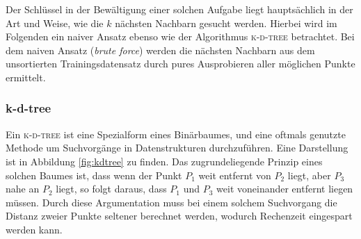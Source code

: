 Der Schlüssel in der Bewältigung einer solchen Aufgabe liegt hauptsächlich in der Art und Weise, wie die $k$ nächsten Nachbarn gesucht werden. Hierbei wird im Folgenden ein naiver Ansatz ebenso wie der Algorithmus \textsc{k-d-tree} betrachtet. Bei dem naiven Ansatz (\textit{brute force}) werden die nächsten Nachbarn aus dem unsortierten Trainingsdatensatz durch pures Ausprobieren aller möglichen Punkte ermittelt.

\subsubsection{k-d-tree}
Ein \textsc{k-d-tree} ist eine Spezialform eines Binärbaumes, und eine oftmals genutzte Methode um Suchvorgänge in Datenstrukturen durchzuführen. Eine Darstellung ist in Abbildung \ref{fig:kdtree} zu finden. Das zugrundeliegende Prinzip eines solchen Baumes ist, dass wenn der Punkt $P_1$ weit entfernt von $P_2$ liegt, aber $P_3$ nahe an $P_2$ liegt, so folgt daraus, dass $P_1$ und $P_3$ weit voneinander entfernt liegen müssen. Durch diese Argumentation muss bei einem solchem Suchvorgang die Distanz zweier Punkte seltener berechnet werden, wodurch Rechenzeit eingespart werden kann.\\


